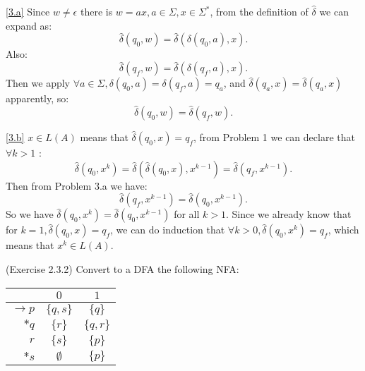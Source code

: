 \documentclass[10pt]{homework}
\begin{document}
\begin{solution}

    \ref{3.a}
    Since $w\ne\epsilon$ there is $w=ax,a\in\Sigma,x\in\Sigma^{*}$, from the definition of $\hat{\delta}$ we can expand as:
    \[
    \hat{\delta}(q_0,w)=\hat{\delta}(\delta(q_0,a),x)
    .\] 
    Also:
    \[
    \hat{\delta}(q_f,w)=\hat{\delta}(\delta(q_f,a),x)
    .\] 
    Then we apply $\forall a\in\Sigma,\delta(q_0,a)=\delta(q_f,a)=q_a$, and $\hat{\delta}(q_a,x)=\hat{\delta}(q_a,x)$ apparently, so:
    \[
    \hat{\delta}(q_0,w)=\hat{\delta}(q_f,w)
    .\] 

    \ref{3.b}
    $x\in L(A)$ means that $\hat{\delta}(q_0,x)=q_f$, from Problem 1 we can declare that $\forall k>1$ :
    \[
    \hat{\delta}(q_0,x^{k})=\hat{\delta}(\hat{\delta}(q_0,x),x^{k-1})=\hat{\delta}(q_f,x^{k-1})
    .\] 
    Then from Problem 3.a we have:
    \[
    \hat{\delta}(q_f,x^{k-1})=\hat{\delta}(q_0,x^{k-1})
    .\] 
    So we have $\hat{\delta}(q_0,x^{k})=\hat{\delta}(q_0,x^{k-1})$ for all $k>1$. Since we already know that for $k=1,\hat{\delta}(q_0,x)=q_f$, we can do induction that $\forall k>0,\hat{\delta}(q_0,x^{k})=q_f$, which means that $x^{k}\in L(A)$.

\end{solution}

\begin{problem} (Exercise 2.3.2)
  Convert to a DFA the following NFA:\@
  \begin{table}[h]
    \centering
    \begin{tabular}{r||c|c} %
      & $0$ & $1$\\\hline\hline  %
      $\rightarrow p$ & $\{q, s\}$ & $\{q\}$\\
      $*q$ & $\{r\}$ & $\{q, r\}$\\
      $r$ & $\{s\}$ & $\{p\}$\\
      $*s$ & $\emptyset$ & $\{p\}$
    \end{tabular}
  \end{table}
\end{problem}
\end{document}
